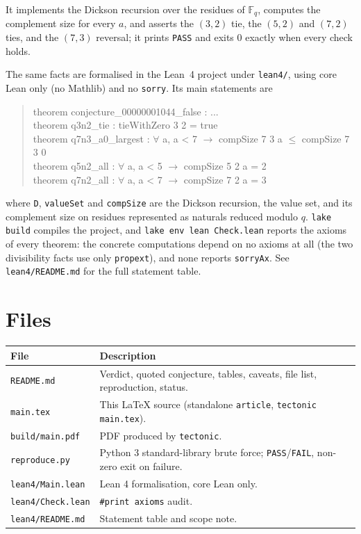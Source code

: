 \documentclass[11pt]{article}
\theoremstyle{definition}
\theoremstyle{remark}
\newcommand{\F}{\mathbb{F}}
\begin{document}
It implements the Dickson recursion over the residues of $\F_q$, computes the
complement size for every $a$, and asserts the $(3,2)$ tie, the $(5,2)$ and
$(7,2)$ ties, and the $(7,3)$ reversal; it prints \texttt{PASS} and exits $0$
exactly when every check holds.

The same facts are formalised in the Lean~4 project under \texttt{lean4/},
using core Lean only (no Mathlib) and no \texttt{sorry}. Its main statements
are

\begin{quote}\ttfamily
theorem conjecture\_00000001044\_false : ...\\
theorem q3n2\_tie : tieWithZero 3 2 = true\\
theorem q7n3\_a0\_largest : \(\forall\) a, a < 7 \(\to\) compSize 7 3 a \(\le\) compSize 7 3 0\\
theorem q5n2\_all : \(\forall\) a, a < 5 \(\to\) compSize 5 2 a = 2\\
theorem q7n2\_all : \(\forall\) a, a < 7 \(\to\) compSize 7 2 a = 3
\end{quote}

\noindent where \texttt{D}, \texttt{valueSet} and \texttt{compSize} are the
Dickson recursion, the value set, and its complement size on residues
represented as naturals reduced modulo $q$. \texttt{lake build} compiles the
project, and \texttt{lake env lean Check.lean} reports the axioms of every
theorem: the concrete computations depend on no axioms at all (the two
divisibility facts use only \texttt{propext}), and none reports
\texttt{sorryAx}. See \texttt{lean4/README.md} for the full statement table.

\section{Files}

\begin{tabular}{l l}
\toprule
File & Description \\
\midrule
\texttt{README.md} & Verdict, quoted conjecture, tables, caveats, file list, reproduction, status. \\
\texttt{main.tex} & This LaTeX source (standalone \texttt{article}, \texttt{tectonic main.tex}). \\
\texttt{build/main.pdf} & PDF produced by \texttt{tectonic}. \\
\texttt{reproduce.py} & Python 3 standard-library brute force; \texttt{PASS}/\texttt{FAIL}, non-zero exit on failure. \\
\texttt{lean4/Main.lean} & Lean 4 formalisation, core Lean only. \\
\texttt{lean4/Check.lean} & \texttt{\#print axioms} audit. \\
\texttt{lean4/README.md} & Statement table and scope note. \\
\bottomrule
\end{tabular}
\end{document}

